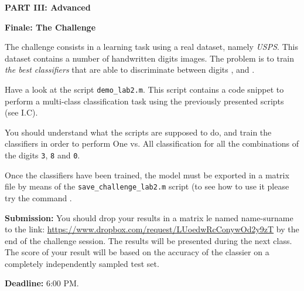 \documentclass[DIN, pagenumber=false, fontsize=11pt, parskip=half]{scrartcl}
\newcommand{\mysection}[1]{\noindent\large\textbf{#1}}
\begin{document}
 
 


\begin{center}
\large\textbf{PART III: Advanced}
\end{center}

\mysection{Finale: The Challenge}

The challenge consists in a learning task using a real dataset, namely \emph{USPS}. This dataset contains a number of handwritten digits images. The problem is to train \emph{the best classifiers} that are able to discriminate between digits ,  and .

Have a look at the script \texttt{demo\_lab2.m}. This script contains a code snippet to perform a multi-class classification task using the previously presented scripts (see I.C).

You should understand what the scripts are supposed to do, and train the classifiers in order to perform One vs. All classification for all the combinations of the digits \texttt{3}, \texttt{8} and \texttt{0}.

Once the classifiers have been trained, the model must be exported in a matrix file by means of the \texttt{save\_challenge\_lab2.m} script (to see how to use it please try the command .

\begin{framed}
\textbf{Submission:}
You should drop your results in a matrix le named
name-surname to the link: \url{https://www.dropbox.com/request/LUoedwRcConywOd2y9zT} by the end of the challenge session.
The results will be presented during the next class. The score of your result
will be based on the accuracy of the classier on a completely independently
sampled test set.

\textbf{Deadline:} 6:00 PM.
\end{framed}
\end{document}
